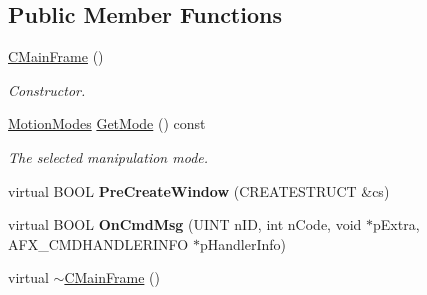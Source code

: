 \subsection*{Public Member Functions}
\begin{DoxyCompactItemize}
\item 
\hypertarget{class_c_main_frame_af3e997aeae4148d2aaa4a1e1ae7bdd53}{\hyperlink{class_c_main_frame_af3e997aeae4148d2aaa4a1e1ae7bdd53}{C\+Main\+Frame} ()}\label{class_c_main_frame_af3e997aeae4148d2aaa4a1e1ae7bdd53}

\begin{DoxyCompactList}\small\item\em Constructor. \end{DoxyCompactList}\item 
\hyperlink{class_c_main_frame_a89722c82d82f95a761772a8dd9755b7b}{Motion\+Modes} \hyperlink{class_c_main_frame_a76c571ab75752dba8049e08f5e4ac920}{Get\+Mode} () const 
\begin{DoxyCompactList}\small\item\em The selected manipulation mode. \end{DoxyCompactList}\item 
\hypertarget{class_c_main_frame_a549bf677c955c2898c3c683321633c16}{virtual B\+O\+O\+L {\bfseries Pre\+Create\+Window} (C\+R\+E\+A\+T\+E\+S\+T\+R\+U\+C\+T \&cs)}\label{class_c_main_frame_a549bf677c955c2898c3c683321633c16}

\item 
\hypertarget{class_c_main_frame_ade959eb0bab719bf06bb9b18ee407101}{virtual B\+O\+O\+L {\bfseries On\+Cmd\+Msg} (U\+I\+N\+T n\+I\+D, int n\+Code, void $\ast$p\+Extra, A\+F\+X\+\_\+\+C\+M\+D\+H\+A\+N\+D\+L\+E\+R\+I\+N\+F\+O $\ast$p\+Handler\+Info)}\label{class_c_main_frame_ade959eb0bab719bf06bb9b18ee407101}

\item 
\hypertarget{class_c_main_frame_a8ae555f23fdf97edb4feb4d3e1bfa4ee}{virtual \hyperlink{class_c_main_frame_a8ae555f23fdf97edb4feb4d3e1bfa4ee}{$\sim$\+C\+Main\+Frame} ()}\label{class_c_main_frame_a8ae555f23fdf97edb4feb4d3e1bfa4ee}


\end{DoxyCompactItemize}
